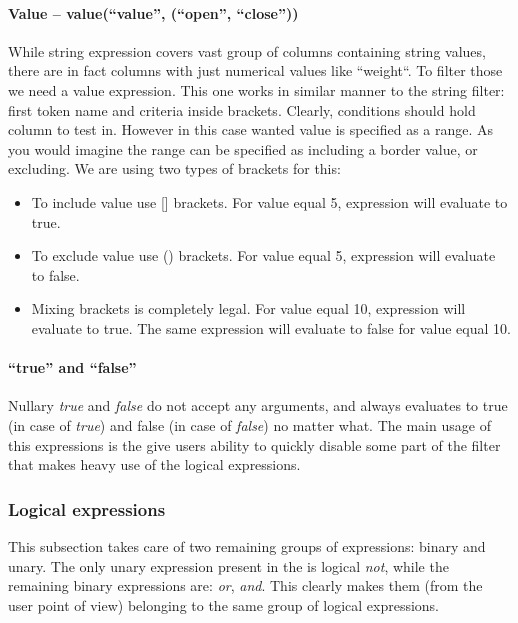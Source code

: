 \paragraph{Value -- value(``value'', (``open'', ``close''))}
While string expression covers vast group of columns containing string values, there are in fact columns with just numerical values like
``weight``. To filter those we need a value expression. This one works in similar manner to the string filter: first token name and criteria
inside brackets. Clearly, conditions should hold column to test in. However in this case wanted value is specified as a range.
As you would imagine the range can be specified as including a border value, or excluding. We are using two types of brackets for this:
\begin{itemize}
 \item To include value use [] brackets. For value equal 5, expression  will evaluate to true.
 \item To exclude value use () brackets. For value equal 5, expression  will evaluate to false.
 \item Mixing brackets is completely legal. For value equal 10, expression \mono{value(something, [5, 10)} will evaluate to true.
 The same expression will evaluate to false for value equal 10.
\end{itemize}

\paragraph{``true'' and ``false''}
Nullary \textit{true} and \textit{false} do not accept any arguments, and always evaluates to true (in case of \textit{true})
and false (in case of \textit{false})  no matter what. The main usage of this expressions is the give users ability to quickly
disable some part of the filter that makes heavy use of the logical expressions. 

\subsubsection{Logical expressions}
This subsection takes care of two remaining groups of expressions: binary and unary. The only unary expression present in the \OCS{} is logical
\textit{not}, while the remaining binary expressions are: \textit{or}, \textit{and}. This clearly makes them (from the user point of view)
belonging to the same group of logical expressions.

